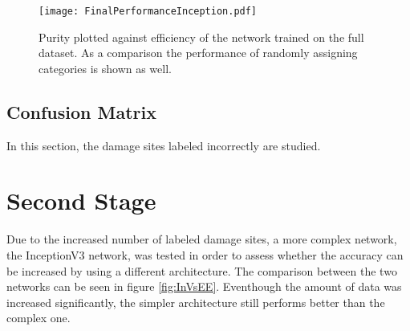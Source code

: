 
\begin{figure}
  \texttt{[image: FinalPerformanceInception.pdf]}
\caption{Purity plotted against efficiency of the network trained on the full dataset. As a comparison the performance of randomly assigning categories is shown as well.}
\label{fig:FirstClassifierFinal}
\end{figure}


\subsection{Confusion Matrix}
In this section, the damage sites labeled incorrectly are studied. 

\newpage
\section{Second Stage}
Due to the increased number of labeled damage sites, a more complex network, the InceptionV3 network, was tested in order to assess whether the accuracy can be increased by using a different architecture. The comparison between the two networks can be seen in figure \ref{fig:InVsEE}. Eventhough the amount of data was increased significantly, the simpler architecture still performs better than the complex one. 

